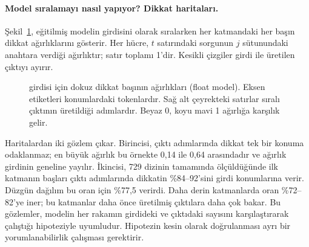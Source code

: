 \paragraph{Model sıralamayı nasıl yapıyor? Dikkat haritaları.} Şekil~\ref{fig:harita}, eğitilmiş modelin  girdisini  olarak sıralarken her katmandaki her başın dikkat ağırlıklarını gösterir. Her hücre, $t$ satırındaki sorgunun $j$ sütunundaki anahtara verdiği ağırlıktır; satır toplamı 1'dir. Kesikli çizgiler girdi ile üretilen çıktıyı ayırır.

\begin{figure}[h]
  \centering
  \caption[Eğitilmiş modelin dikkat haritaları]{ girdisi için dokuz dikkat başının ağırlıkları (float model). Eksen etiketleri konumlardaki tokenlardır. Sağ alt çeyrekteki satırlar sıralı çıktının üretildiği adımlardır. Beyaz 0, koyu mavi 1 ağırlığa karşılık gelir.}
  \label{fig:harita}
\end{figure}

Haritalardan iki gözlem çıkar. Birincisi, çıktı adımlarında dikkat tek bir konuma odaklanmaz; en büyük ağırlık bu örnekte 0,14 ile 0,64 arasındadır ve ağırlık girdinin geneline yayılır. İkincisi, 729 dizinin tamamında ölçüldüğünde ilk katmanın başları çıktı adımlarında dikkatin \%84--92'sini girdi konumlarına verir. Düzgün dağılım bu oran için \%77,5 verirdi. Daha derin katmanlarda oran \%72--82'ye iner; bu katmanlar daha önce üretilmiş çıktılara daha çok bakar. Bu gözlemler, modelin her rakamın girdideki ve çıktıdaki sayısını karşılaştırarak çalıştığı hipoteziyle uyumludur. Hipotezin kesin olarak doğrulanması ayrı bir yorumlanabilirlik çalışması gerektirir.
